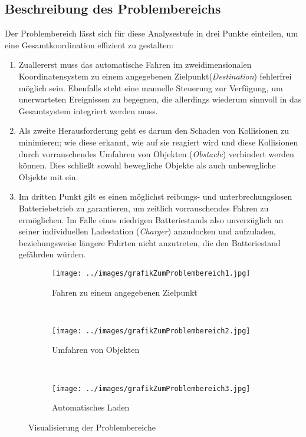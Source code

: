 \documentclass[includeheaders]{scrartcl}
\begin{document}
		\subsection{Beschreibung des Problembereichs}
		Der Problembereich lässt sich für diese Analysestufe in drei Punkte einteilen, um eine Gesamtkoordination effizient zu gestalten:

		\begin{enumerate}
		\item
			Zuallererst muss das automatische Fahren im zweidimensionalen
			Koordinatensystem zu einem angegebenen Zielpunkt(\emph{Destination})
			fehlerfrei möglich sein. Ebenfalls steht eine manuelle Steuerung zur
			Verfügung, um unerwarteten Ereignissen zu begegnen, die allerdings
			wiederum sinnvoll in das Gesamtsystem integriert werden muss.
		\item
			Als zweite Herausforderung geht es darum den Schaden von Kollisionen
			zu minimieren; wie diese erkannt, wie auf sie reagiert wird und diese
			Kollisionen durch vorrauschendes Umfahren von
			Objekten (\emph{Obstacle}) verhindert werden können. Dies schließt
			sowohl bewegliche Objekte als auch unbewegliche Objekte mit ein.
		\item
			Im dritten Punkt gilt es einen möglichst reibungs- und
			unterbrechungslosen Batteriebetrieb zu garantieren, um zeitlich
			vorrauschendes Fahren zu ermöglichen. Im Falle eines niedrigen
			Batteriestands also unverzüglich an seiner individuellen Ladestation 
			(\emph{Charger}) anzudocken und aufzuladen, beziehungsweise längere
			Fahrten nicht anzutreten, die den Batteriestand gefährden würden.
		\end{enumerate}

		\begin{figure}[H]
			\centering
			\begin{subfigure}[t]{0.3\textwidth}
				\texttt{[image: ../images/grafikZumProblembereich1.jpg]}
				\caption{Fahren zu einem angegebenen Zielpunkt}
				\label{fig:2-1-problembereich-1}
			\end{subfigure}
			~~~~
			\begin{subfigure}[t]{0.3\textwidth}
				\texttt{[image: ../images/grafikZumProblembereich2.jpg]}
				\caption{Umfahren von Objekten}
				\label{fig:2-1-problembereich-2}
			\end{subfigure}
			~~~~
			\begin{subfigure}[t]{0.3\textwidth}
				\texttt{[image: ../images/grafikZumProblembereich3.jpg]}
				\caption{Automatisches Laden}
				\label{fig:2-1-problembereich-3}
			\end{subfigure}
			\caption{Visualisierung der Problembereiche}\label{fig:2-1-problembereiche}
		\end{figure}
\end{document}
